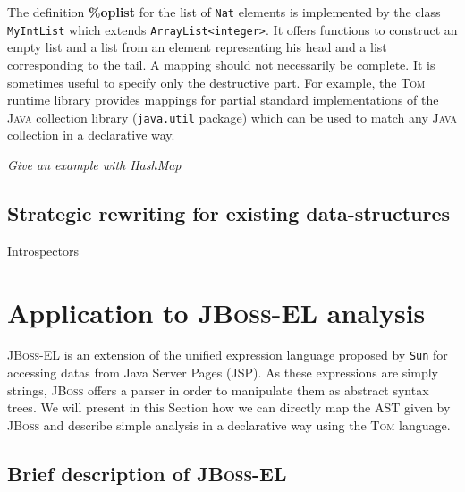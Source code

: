 \documentclass[runningheads]{llncs}
\newcommand{\jbossel}{\textsc{JBoss-EL}}
\newcommand{\jboss}{\textsc{JBoss}}
\newcommand{\jsp}{\textsc{JSP}}
\newcommand{\tom}{\textsc{Tom}}
\newcommand{\java}{\textsc{Java}}
\newcommand{\lex}[1]{{\textrm{\textbf{#1}}}}
\begin{document}

	
The definition \lex{\%oplist} for the list of \texttt{Nat} elements is
implemented by the class \texttt{MyIntList} which extends
\texttt{ArrayList<integer>}. It offers functions to construct an empty list and
a list from an element representing his head and a list corresponding to the
tail.  A mapping should not necessarily be complete. It is sometimes useful to
specify only the destructive part. For example, the {\tom} runtime library
provides mappings for partial standard implementations of the {\java}
collection library (\texttt{java.util} package) which can be used to match any
{\java} collection in a declarative way.

\emph{Give an example with HashMap}

\subsection{Strategic rewriting for existing data-structures}

Introspectors

\section{Application to {\jbossel} analysis}

{\jbossel} is an extension of the unified expression language proposed by
\texttt{Sun} for accessing datas from Java Server Pages ({\jsp}). As these
expressions are simply strings, {\jboss} offers a parser in order to manipulate
them as abstract syntax trees. We will present in this Section how we
can directly map the AST given by {\jboss} and describe simple analysis
in a declarative way using the {\tom} language.

\subsection{Brief description of {\jbossel}}
\end{document}
